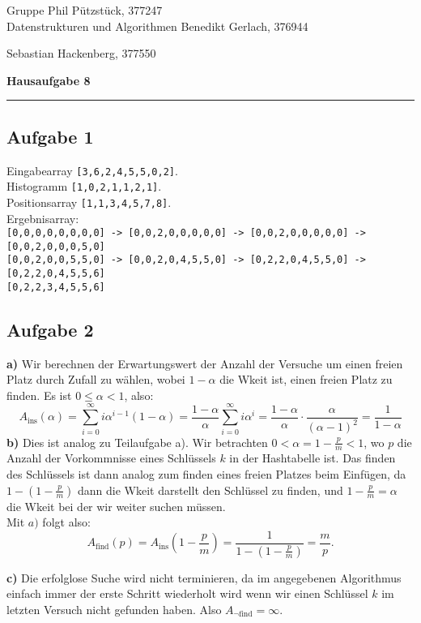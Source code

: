 \documentclass[a4paper,graphics,11pt]{article}
\newcommand{\aufgabe}[1]{\subsection*{Aufgabe #1}}
\begin{document}
\noindent Gruppe              \hfill Phil Pützstück, 377247\\
\noindent Datenstrukturen und Algorithmen \hfill Benedikt Gerlach, 376944\\
\strut\hfill Sebastian Hackenberg, 377550\\
\begin{center}
	\LARGE{\textbf{Hausaufgabe 8}}
\end{center}
\begin{center}
\rule[0.1ex]{\textwidth}{1pt}
\end{center}

\aufgabe{1}
Eingabearray \texttt{[3,6,2,4,5,5,0,2]}.\\
Histogramm \texttt{[1,0,2,1,1,2,1]}.\\
Positionsarray \texttt{[1,1,3,4,5,7,8]}.\\
Ergebnisarray:\\
\texttt{[0,0,0,0,0,0,0,0] -> [0,0,2,0,0,0,0,0] -> [0,0,2,0,0,0,0,0] -> [0,0,2,0,0,0,5,0]}\\
\texttt{[0,0,2,0,0,5,5,0] -> [0,0,2,0,4,5,5,0] -> [0,2,2,0,4,5,5,0] -> [0,2,2,0,4,5,5,6]}\\
\texttt{[0,2,2,3,4,5,5,6]}

\aufgabe{2}
\textbf{a)}
Wir berechnen der Erwartungswert der Anzahl der Versuche um einen freien Platz durch Zufall zu wählen, wobei $1-\alpha$ die Wkeit ist,
einen freien Platz zu finden. Es ist $0 \leq\alpha < 1$, also:
$$
    A_\text{ins}(\alpha)
    = \sum_{i=0}^{\infty} i\alpha^{i-1}(1-\alpha)
    = \frac{1-\alpha}{\alpha}\sum_{i=0}^{\infty} i\alpha^i
    = \frac{1-\alpha}{\alpha} \cdot \frac{\alpha}{(\alpha-1)^2}
    = \frac{1}{1-\alpha}
$$
\textbf{b)}
Dies ist analog zu Teilaufgabe a). Wir betrachten $0 < \alpha = 1 - \frac{p}{m} < 1$, wo $p$ die Anzahl der Vorkommnisse eines Schlüssels $k$
in der Hashtabelle ist. Das finden des Schlüssels ist dann analog zum finden eines freien Platzes beim Einfügen, da $1-(1-\frac{p}{m})$ dann
die Wkeit darstellt den Schlüssel zu finden, und $1-\frac{p}{m} = \alpha$ die Wkeit bei der wir weiter suchen müssen. \\
Mit $a)$ folgt also:
$$
    A_\text{find}(p) = A_\text{ins}(1-\frac{p}{m}) = \frac{1}{1-(1-\frac{p}{m})} = \frac{m}{p}.
$$

\textbf{c)}
Die erfolglose Suche wird nicht terminieren, da im angegebenen Algorithmus einfach immer der erste Schritt wiederholt wird wenn wir einen 
Schlüssel $k$ im letzten Versuch nicht gefunden haben. Also $A_\text{$\lnot$find} = \infty$.
\end{document}
